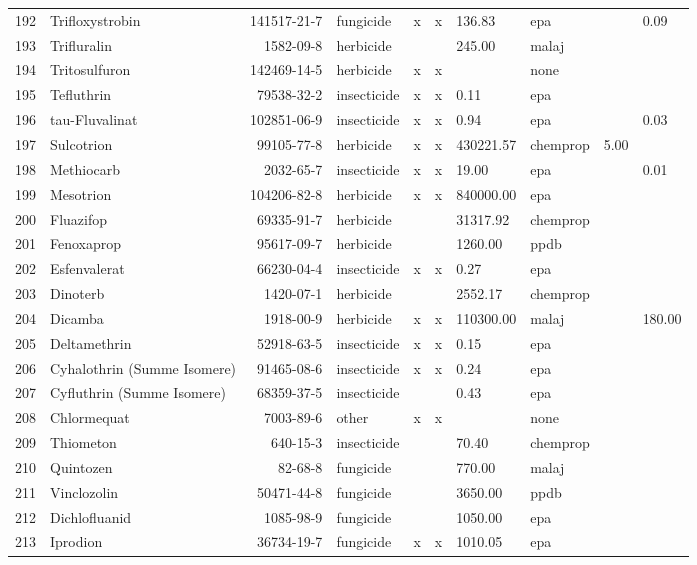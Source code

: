 \begin{longtable}{lp{3cm}rlp{0.5cm}p{0.5cm}p{1cm}p{1cm}p{1cm}p{1cm}}
  192 & Trifloxystrobin & 141517-21-7 & fungicide & x & x & 136.83 & epa &  & 0.09 \\ 
  193 & Trifluralin & 1582-09-8 & herbicide &  &  & 245.00 & malaj &  &  \\ 
  194 & Tritosulfuron & 142469-14-5 & herbicide & x & x &  & none &  &  \\ 
  195 & Tefluthrin & 79538-32-2 & insecticide & x & x & 0.11 & epa &  &  \\ 
  196 & tau-Fluvalinat & 102851-06-9 & insecticide & x & x & 0.94 & epa &  & 0.03 \\ 
  197 & Sulcotrion & 99105-77-8 & herbicide & x & x & 430221.57 & chemprop & 5.00 &  \\ 
  198 & Methiocarb & 2032-65-7 & insecticide & x & x & 19.00 & epa &  & 0.01 \\ 
  199 & Mesotrion & 104206-82-8 & herbicide & x & x & 840000.00 & epa &  &  \\ 
  200 & Fluazifop & 69335-91-7 & herbicide &  &  & 31317.92 & chemprop &  &  \\ 
  201 & Fenoxaprop & 95617-09-7 & herbicide &  &  & 1260.00 & ppdb &  &  \\ 
  202 & Esfenvalerat & 66230-04-4 & insecticide & x & x & 0.27 & epa &  &  \\ 
  203 & Dinoterb & 1420-07-1 & herbicide &  &  & 2552.17 & chemprop &  &  \\ 
  204 & Dicamba & 1918-00-9 & herbicide & x & x & 110300.00 & malaj &  & 180.00 \\ 
  205 & Deltamethrin & 52918-63-5 & insecticide & x & x & 0.15 & epa &  &  \\ 
  206 & Cyhalothrin (Summe Isomere) & 91465-08-6 & insecticide & x & x & 0.24 & epa &  &  \\ 
  207 & Cyfluthrin (Summe Isomere) & 68359-37-5 & insecticide &  &  & 0.43 & epa &  &  \\ 
  208 & Chlormequat & 7003-89-6 & other & x & x &  & none &  &  \\ 
  209 & Thiometon & 640-15-3 & insecticide &  &  & 70.40 & chemprop &  &  \\ 
  210 & Quintozen & 82-68-8 & fungicide &  &  & 770.00 & malaj &  &  \\ 
  211 & Vinclozolin & 50471-44-8 & fungicide &  &  & 3650.00 & ppdb &  &  \\ 
  212 & Dichlofluanid & 1085-98-9 & fungicide &  &  & 1050.00 & epa &  &  \\ 
  213 & Iprodion & 36734-19-7 & fungicide & x & x & 1010.05 & epa &  &  \\ 

\end{longtable}
